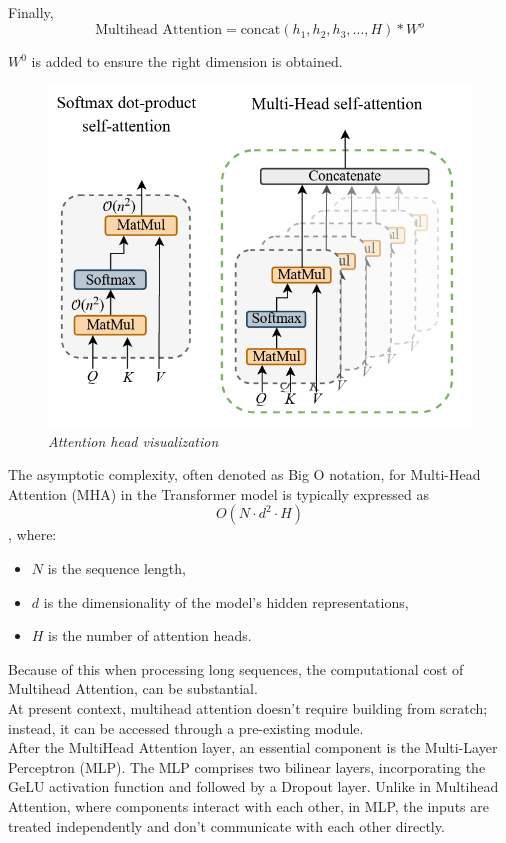 Finally, \[\text{Multihead Attention} = \text{concat} (h_1, h_2, h_3,...,H)* W^o \]

$W^0$ is added to ensure the right dimension is obtained.


\begin{figure}[htbp]
    \centering
    \includegraphics[width=5in]{img/Attentionfig.png}
    \caption{\textit{Attention head visualization}}
\end{figure}

The asymptotic complexity, often denoted as Big O notation, for Multi-Head Attention (MHA) in the Transformer model is typically expressed as\[ O(N \cdot d^2 \cdot H)\], where:
\begin{itemize}
  \item $N$ is the sequence length,
  \item $d$ is the dimensionality of the model's hidden representations,
  \item $H$ is the number of attention heads.
\end{itemize}
Because of this when processing long sequences, the computational cost of Multihead Attention, can be substantial.\\

At present context, multihead attention doesn't require building from scratch; instead, it can be accessed through a pre-existing module.\\

After the MultiHead Attention layer, an essential component is the Multi-Layer Perceptron (MLP). The MLP comprises two bilinear layers, incorporating the GeLU activation function and followed by a Dropout layer. Unlike in Multihead Attention, where components interact with each other, in MLP, the inputs are treated independently and don't communicate with each other directly.\\

